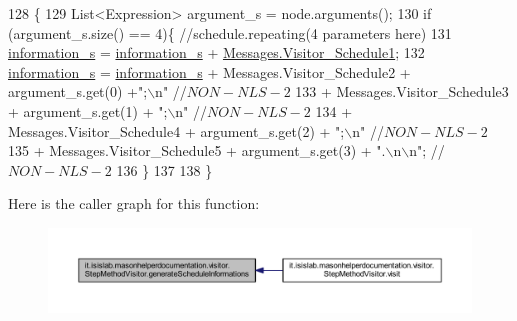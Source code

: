 \begin{DoxyCode}
128                                                                      \{
129         List<Expression> argument\_s = node.arguments();
130         \textcolor{keywordflow}{if} (argument\_s.size() == 4)\{    \textcolor{comment}{//schedule.repeating(4 parameters here)}
131             \hyperlink{classit_1_1isislab_1_1masonhelperdocumentation_1_1visitor_1_1_step_method_visitor_adf58f8f5068e330783c3c4bd78080f1a}{information\_s} = \hyperlink{classit_1_1isislab_1_1masonhelperdocumentation_1_1visitor_1_1_step_method_visitor_adf58f8f5068e330783c3c4bd78080f1a}{information\_s} + 
      \hyperlink{classit_1_1isislab_1_1masonhelperdocumentation_1_1visitor_1_1_messages_a50822a1d6f5dd658aac1c947608b524b}{Messages.Visitor\_Schedule1};
132             \hyperlink{classit_1_1isislab_1_1masonhelperdocumentation_1_1visitor_1_1_step_method_visitor_adf58f8f5068e330783c3c4bd78080f1a}{information\_s} = \hyperlink{classit_1_1isislab_1_1masonhelperdocumentation_1_1visitor_1_1_step_method_visitor_adf58f8f5068e330783c3c4bd78080f1a}{information\_s} + Messages.Visitor\_Schedule2 + 
      argument\_s.get(0) +\textcolor{stringliteral}{";\(\backslash\)n"} \textcolor{comment}{//$NON-NLS-2$}
133                                 + Messages.Visitor\_Schedule3 + argument\_s.get(1) + \textcolor{stringliteral}{";\(\backslash\)n"} \textcolor{comment}{//$NON-NLS-2$}
134                                 + Messages.Visitor\_Schedule4 + argument\_s.get(2) + \textcolor{stringliteral}{";\(\backslash\)n"} \textcolor{comment}{//$NON-NLS-2$}
135                                 + Messages.Visitor\_Schedule5 + argument\_s.get(3) + \textcolor{stringliteral}{".\(\backslash\)n\(\backslash\)n"}; \textcolor{comment}{//$NON-NLS-2$}
136         \}
137         
138     \}
\end{DoxyCode}


Here is the caller graph for this function\-:\nopagebreak
\begin{figure}[H]
\begin{center}
\leavevmode
\includegraphics[width=350pt]{classit_1_1isislab_1_1masonhelperdocumentation_1_1visitor_1_1_step_method_visitor_aecf5552414bc7ba6913a5e026c6048cd_icgraph}
\end{center}
\end{figure}


